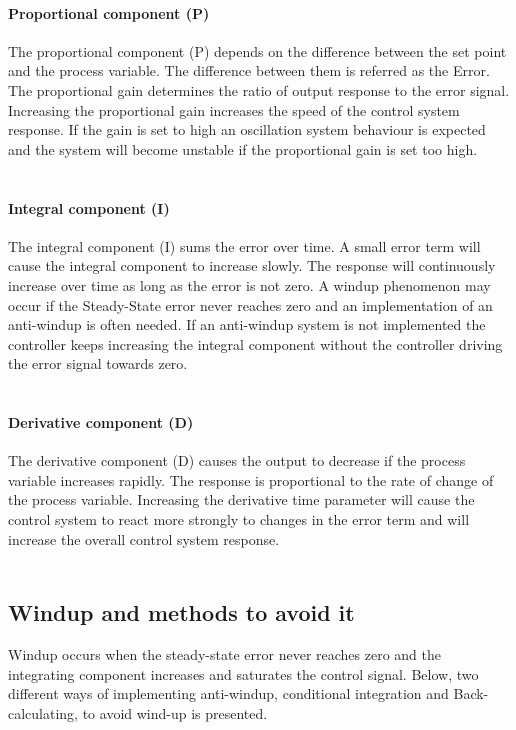 \paragraph{Proportional component (P)} 
The proportional component (P) depends on the difference between the set point and the process variable. The difference between them is referred as the Error. The proportional gain determines the ratio of output response to the error signal. Increasing the proportional gain increases the speed of the control system response. If the gain is set to high an oscillation system behaviour is expected and the system will become unstable if the proportional gain is set too high. 
\\
\\
\paragraph{Integral component (I)}
The integral component (I) sums the error over time. A small error term will cause the integral component to increase slowly. The response will continuously increase over time as long as the error is not zero. A windup phenomenon may occur if the Steady-State error never reaches zero and an implementation of an anti-windup is often needed. If an anti-windup system is not implemented the controller keeps increasing the integral component without the controller driving the error signal towards zero. 
\\
\\
\paragraph{Derivative component (D)}
The derivative component (D) causes the output to decrease if the process variable increases rapidly. The response is proportional to the rate of change of the process variable. Increasing the derivative time parameter will cause the control system to react more strongly to changes in the error term and will increase the overall control system response. \cite{PID}
\\
\\
\subsection{Windup and methods to avoid it}
Windup occurs when the steady-state error never reaches zero and the integrating component increases and saturates the control signal. Below, two different ways of implementing anti-windup, conditional integration and Back-calculating, to avoid wind-up is presented.\\
\\

